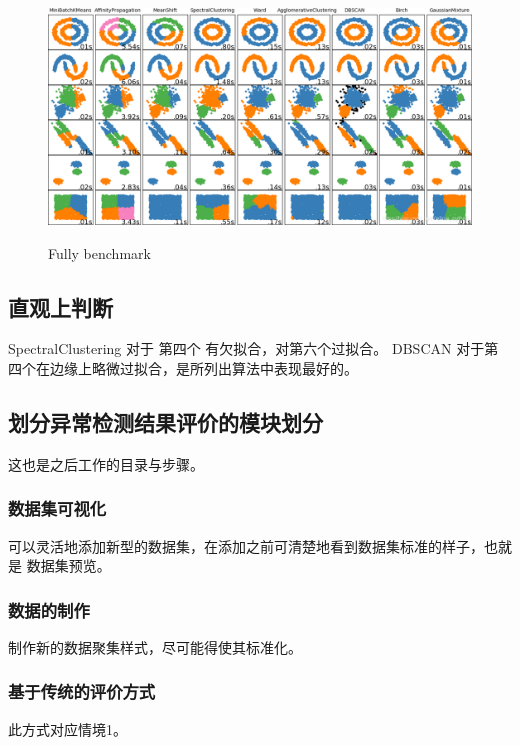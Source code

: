 \documentclass[UTF8]{ctexart}
\begin{document}
\begin{figure}[H] %
\centering %
\includegraphics[width=1.0\textwidth]{cite_dataset.png} %
\caption{Fully benchmark} %
\protect\cite{link8}
\end{figure}

\subsection{直观上判断}

SpectralClustering 对于 第四个 有欠拟合，对第六个过拟合。
DBSCAN 对于第四个在边缘上略微过拟合，是所列出算法中表现最好的。

\subsection{划分异常检测结果评价的模块划分}
这也是之后工作的目录与步骤。
    \subsubsection{数据集可视化}
    可以灵活地添加新型的数据集，在添加之前可清楚地看到数据集标准的样子，也就是 数据集预览。

    \subsubsection{数据的制作}
    制作新的数据聚集样式，尽可能得使其标准化。

    \subsubsection{基于传统的评价方式}
    此方式对应情境1。
\end{document}
